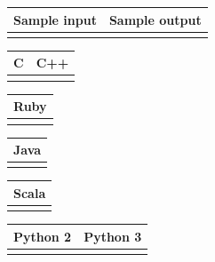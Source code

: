 \begin{tabular}{|p{}|p{}|}
\hline
\textbf{Sample input} & \textbf{Sample output} \\
\hline
 &
 \\
\hline
\end{tabular}

\begin{tabular}{|p{}|p{}|}
\hline
\textbf{C} & \textbf{C++} \\
\hline
&
\\
\hline
\end{tabular}

\begin{tabular}{|p{}|}
\hline
\textbf{Ruby}\\
\hline
\\
\hline
\end{tabular}


\begin{tabular}{|p{}|}
\hline
\textbf{Java}\\
\hline
\\
\hline
\end{tabular}

\begin{tabular}{|p{}|}
\hline
\textbf{Scala}\\
\hline
\\
\hline
\end{tabular}

\begin{tabular}{|p{}|p{}|}
\hline
\textbf{Python 2} & \textbf{Python 3} \\
\hline
&
\\
\hline
\end{tabular}


